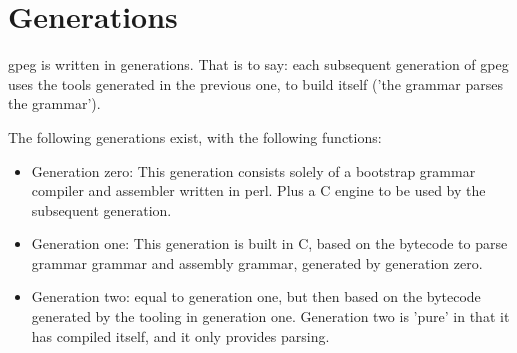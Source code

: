 \section{Generations}

gpeg is written in generations. That is to say:
each subsequent generation of gpeg uses the tools generated
in the previous one, to build itself ('the grammar parses the grammar').

The following generations exist, with the following functions:

\begin{itemize}

\item Generation zero: This generation consists solely of a bootstrap
      grammar compiler and assembler written in perl. Plus a C engine
      to be used by the subsequent generation.

\item Generation one: This generation is
      built in C, based on the bytecode to parse grammar grammar
      and assembly grammar, generated by generation zero.

\item Generation two: equal to generation one, but then based on
      the bytecode generated by the tooling in generation one.
      Generation two is 'pure' in that it has compiled itself,
      and it only provides parsing.

\end{itemize}
